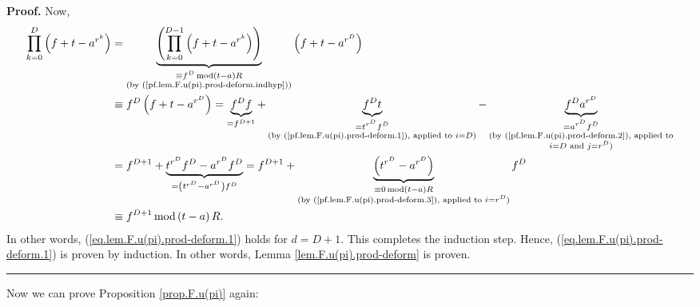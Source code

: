 \documentclass[numbers=enddot,12pt,final,onecolumn,notitlepage]{scrartcl}%
\theoremstyle{definition}
\newenvironment{proof}[1][Proof]{\noindent\textbf{#1.} }{\ \rule{0.5em}{0.5em}}
\let\prodnonlimits\prod
\renewcommand{\prod}{\prodnonlimits\limits}
\begin{document}
\begin{proof}
Now,%
\begin{align*}
\prod_{k=0}^{D}\left(  f+t-a^{r^{k}}\right)   &  =\underbrace{\left(
\prod_{k=0}^{D-1}\left(  f+t-a^{r^{k}}\right)  \right)  }_{\substack{\equiv
f^{D}\operatorname{mod}\left(  t-a\right)  R\\\text{(by
(\ref{pf.lem.F.u(pi).prod-deform.indhyp}))}}}\left(  f+t-a^{r^{D}}\right) \\
&  \equiv f^{D}\left(  f+t-a^{r^{D}}\right)  =\underbrace{f^{D}f}_{=f^{D+1}%
}+\underbrace{f^{D}t}_{\substack{=t^{r^{D}}f^{D}\\\text{(by
(\ref{pf.lem.F.u(pi).prod-deform.1}), applied to }i=D\text{)}}%
}-\underbrace{f^{D}a^{r^{D}}}_{\substack{=a^{r^{D}}f^{D}\\\text{(by
(\ref{pf.lem.F.u(pi).prod-deform.2}), applied to}\\i=D\text{ and }%
j=r^{D}\text{)}}}\\
&  =f^{D+1}+\underbrace{t^{r^{D}}f^{D}-a^{r^{D}}f^{D}}_{=\left(  t^{r^{D}%
}-a^{r^{D}}\right)  f^{D}}=f^{D+1}+\underbrace{\left(  t^{r^{D}}-a^{r^{D}%
}\right)  }_{\substack{\equiv0\operatorname{mod}\left(  t-a\right)
R\\\text{(by (\ref{pf.lem.F.u(pi).prod-deform.3}), applied to }i=r^{D}%
\text{)}}}f^{D}\\
&  \equiv f^{D+1}\operatorname{mod}\left(  t-a\right)  R.
\end{align*}
In other words, (\ref{eq.lem.F.u(pi).prod-deform.1}) holds for $d=D+1$. This
completes the induction step. Hence, (\ref{eq.lem.F.u(pi).prod-deform.1}) is
proven by induction. In other words, Lemma \ref{lem.F.u(pi).prod-deform} is proven.
\end{proof}

Now we can prove Proposition \ref{prop.F.u(pi)} again:
\end{document}
